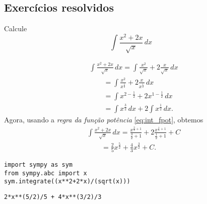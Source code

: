 \subsection{Exercícios resolvidos}

\begin{exeresol}
  Calcule
  \begin{equation}
    \int \frac{x^2+2x}{\sqrt{x}}\,dx
  \end{equation}
\end{exeresol}
\begin{resol}
  \begin{align}
    & \int \frac{x^2+2x}{\sqrt{x}}\,dx = \int \frac{x^2}{\sqrt{x}} + 2\frac{x}{\sqrt{x}}\,dx\\
    &\text{}\qquad = \int \frac{x^2}{x^{\frac{1}{2}}} + 2\frac{x}{x^{\frac{1}{2}}}\,dx\\
    &\text{}\qquad = \int x^{2-\frac{1}{2}} + 2x^{1-\frac{1}{2}}\,dx\\
    &\text{}\qquad = \int x^{\frac{3}{2}}\,dx + 2\int x^{\frac{1}{2}}\,dx.
  \end{align}
  Agora, usando a \emph{regra da função potência} \eqref{eq:int_fpot}, obtemos
  \begin{align}
    & \int \frac{x^2+2x}{\sqrt{x}}\,dx = \frac{x^{\frac{3}{2}+1}}{\frac{3}{2}+1} + 2\frac{x^{\frac{1}{2}+1}}{\frac{1}{2}+1} + C \\
    &\text{}\qquad = \frac{2}{5}x^{\frac{5}{2}} + \frac{4}{3}x^{\frac{3}{2}} + C.
  \end{align}

\begin{lstlisting}
import sympy as sym
from sympy.abc import x
sym.integrate((x**2+2*x)/(sqrt(x)))
\end{lstlisting}

\begin{verbatim}
2*x**(5/2)/5 + 4*x**(3/2)/3
\end{verbatim}

\end{resol}


